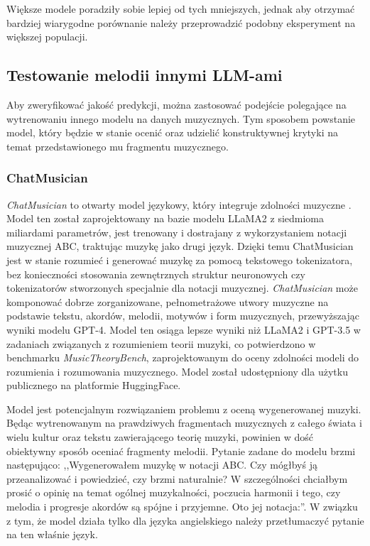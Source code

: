 \documentclass[data-science]{agh-wi} %
\begin{document}
Większe modele poradziły sobie lepiej od tych mniejszych, jednak aby otrzymać bardziej wiarygodne porównanie należy przeprowadzić podobny eksperyment na większej populacji.

\subsection{Testowanie melodii innymi LLM-ami}
Aby zweryfikować jakość predykcji, można zastosować podejście polegające na wytrenowaniu innego modelu na danych muzycznych. Tym sposobem powstanie model, który będzie w stanie ocenić oraz udzielić konstruktywnej krytyki na temat przedstawionego mu fragmentu muzycznego.
\subsubsection*{ChatMusician}
\textit{ChatMusician} to otwarty model językowy, który integruje zdolności muzyczne \cite{yuan2024chatmusician}. Model ten został zaprojektowany na bazie modelu LLaMA2 z siedmioma miliardami parametrów, jest trenowany i dostrajany z wykorzystaniem notacji muzycznej ABC, traktując muzykę jako drugi język. Dzięki temu ChatMusician jest w stanie rozumieć i generować muzykę za pomocą tekstowego tokenizatora, bez konieczności stosowania zewnętrznych struktur neuronowych czy tokenizatorów stworzonych specjalnie dla notacji muzycznej. \textit{ChatMusician} może komponować dobrze zorganizowane, pełnometrażowe utwory muzyczne na podstawie tekstu, akordów, melodii, motywów i form muzycznych, przewyższając wyniki modelu GPT-4. Model ten osiąga lepsze wyniki niż LLaMA2 i GPT-3.5 w zadaniach związanych z rozumieniem teorii muzyki, co potwierdzono w benchmarku \textit{MusicTheoryBench}, zaprojektowanym do oceny zdolności modeli do rozumienia i rozumowania muzycznego. Model został udostępniony dla użytku publicznego na platformie HuggingFace.

Model jest potencjalnym rozwiązaniem problemu z oceną wygenerowanej muzyki. Będąc wytrenowanym na prawdziwych fragmentach muzycznych z całego świata i wielu kultur oraz tekstu zawierającego teorię muzyki, powinien w dość obiektywny sposób oceniać fragmenty melodii. Pytanie zadane do modelu brzmi następująco: ,,Wygenerowałem muzykę w notacji ABC. Czy mógłbyś ją przeanalizować i powiedzieć, czy brzmi naturalnie? W szczególności chciałbym prosić o opinię na temat ogólnej muzykalności, poczucia harmonii i tego, czy melodia i progresje akordów są spójne i przyjemne. Oto jej notacja:''. W związku z tym, że model działa tylko dla języka angielskiego należy przetłumaczyć pytanie na ten właśnie język.
\end{document}

